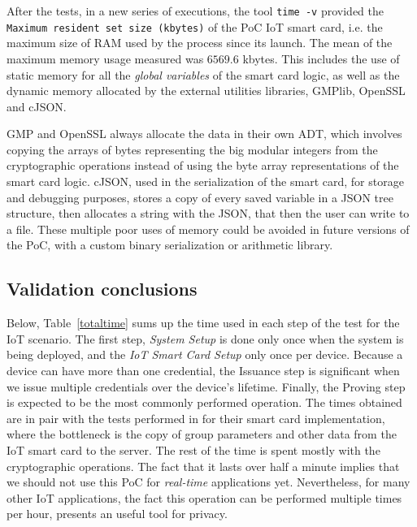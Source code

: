 After the tests, in a new series of executions, the tool \texttt{time -v} provided the \texttt{Maximum resident set size (kbytes)} of the PoC IoT smart card, i.e. the maximum size of RAM used by the process since its launch. The mean of the maximum memory usage measured was $6569.6$ kbytes. This includes the use of static memory for all the \textit{global variables} of the smart card logic, as well as the dynamic memory allocated by the external utilities libraries, GMPlib, OpenSSL and cJSON.

GMP and OpenSSL always allocate the data in their own ADT, which involves copying the arrays of bytes representing the big modular integers from the cryptographic operations instead of using the byte array representations of the smart card logic. cJSON, used in the serialization of the smart card, for storage and debugging purposes, stores a copy of every saved variable in a JSON tree structure, then allocates a string with the JSON, that then the user can write to a file.
These multiple poor uses of memory could be avoided in future versions of the PoC, with a custom binary serialization or arithmetic library.


\subsection{Validation conclusions}


Below, Table~\ref{totaltime} sums up the time used in each step of the test for the IoT scenario.
The first step, \textit{System Setup} is done only once when the system is being deployed, and the \textit{IoT Smart Card Setup} only once per device.
Because a device can have more than one credential, the Issuance step is significant when we issue multiple credentials over the device's lifetime.
Finally, the Proving step is expected to be the most commonly performed operation. The times obtained are in pair with the tests performed in \cite{D42} for their smart card implementation, where the bottleneck is the copy of group parameters and other data from the IoT smart card to the server. The rest of the time is spent mostly with the cryptographic operations. 
The fact that it lasts over half a minute implies that we should not use this PoC for \textit{real-time} applications yet. 
Nevertheless, for many other IoT applications, the fact this operation can be performed multiple times per hour, presents an useful tool for privacy. 


